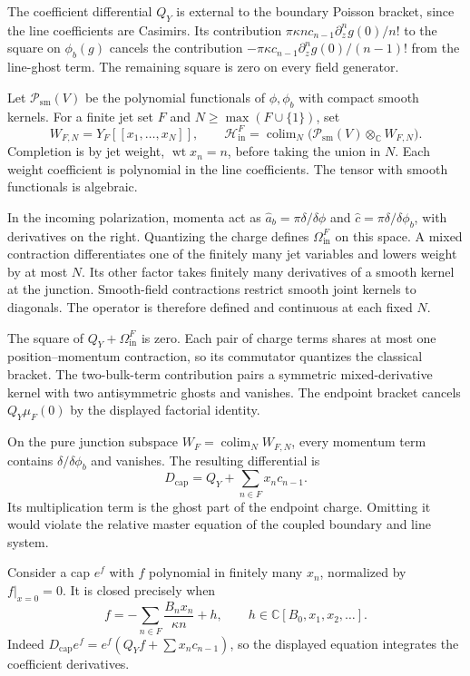 The coefficient differential \(Q_Y\) is external to the boundary Poisson
bracket, since the line coefficients are Casimirs. Its contribution
\(\pi\kappa n c_{n-1}\partial_z^ng(0)/n!\) to the square on \(\phi_b(g)\)
cancels the contribution \(-\pi\kappa c_{n-1}\partial_z^ng(0)/(n-1)!\) from
the line-ghost term. The remaining square is zero on every field generator.

Let \(\mathcal P_{\mathrm{sm}}(V)\) be the polynomial functionals of
\(\phi,\phi_b\) with compact smooth kernels. For a finite jet set \(F\)
and \(N\ge\max(F\cup\{1\})\), set
\[
 W_{F,N}=Y_F[[x_1,\ldots,x_N]],\qquad
 \mathcal H_{\mathrm{in}}^F
   =\operatorname{colim}_N
       \bigl(\mathcal P_{\mathrm{sm}}(V)\otimes_{\mathbb C}W_{F,N}\bigr).
\]
Completion is by jet weight, \(\operatorname{wt}x_n=n\), before taking the
union in \(N\). Each weight coefficient is polynomial in the line
coefficients. The tensor with smooth functionals is algebraic.

In the incoming polarization, momenta act as
\(\widehat a_b=\pi\delta/\delta\phi\) and
\(\widehat c=\pi\delta/\delta\phi_b\), with derivatives on the right.
Quantizing the charge defines \(\Omega_{\mathrm{in}}^F\) on this space.
A mixed contraction differentiates one of the finitely many jet variables
and lowers weight by at most \(N\). Its other factor takes finitely many
derivatives of a smooth kernel at the junction. Smooth-field contractions
restrict smooth joint kernels to diagonals. The operator is therefore
defined and continuous at each fixed \(N\).

The square of \(Q_Y+\Omega_{\mathrm{in}}^F\) is zero. Each pair of charge
terms shares at most one position--momentum contraction, so its commutator
quantizes the classical bracket. The two-bulk-term contribution pairs a
symmetric mixed-derivative kernel with two antisymmetric ghosts and
vanishes. The endpoint bracket cancels \(Q_Y\mu_F(0)\) by the displayed
factorial identity.

On the pure junction subspace \(W_F=\operatorname{colim}_NW_{F,N}\), every
momentum term contains \(\delta/\delta\phi_b\) and vanishes. The resulting
differential is
\[
 D_{\mathrm{cap}}=Q_Y+\sum_{n\in F}x_nc_{n-1}.
\]
Its multiplication term is the ghost part of the endpoint charge. Omitting
it would violate the relative master equation of the coupled boundary and
line system.

Consider a cap \(e^f\) with \(f\) polynomial in finitely many \(x_n\),
normalized by \(f|_{x=0}=0\). It is closed precisely when
\[
 f=-\sum_{n\in F}\frac{B_nx_n}{\kappa n}+h,
 \qquad h\in\mathbb C[B_0,x_1,x_2,\ldots].
\]
Indeed \(D_{\mathrm{cap}}e^f=e^f (Q_Yf+\sum x_nc_{n-1})\), so the displayed
equation integrates the coefficient derivatives.

